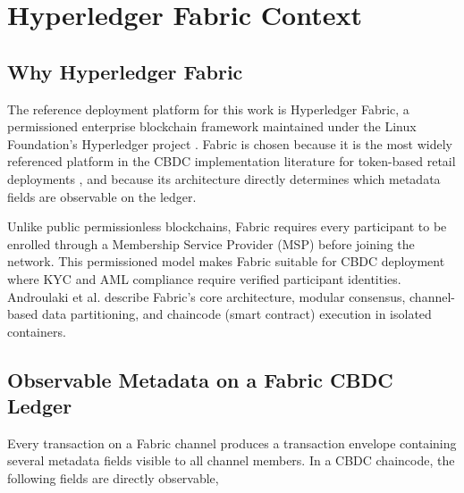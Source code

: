 \section{Hyperledger Fabric Context}
\label{sec:fabric_context}

\subsection{Why Hyperledger Fabric}

The reference deployment platform for this work is
Hyperledger Fabric, a permissioned enterprise blockchain
framework maintained under the Linux Foundation's Hyperledger
project \cite{hyperledgerfabric2023}. Fabric is chosen
because it is the most widely referenced platform in the
CBDC implementation literature for token-based retail
deployments \cite{biscgide2024}, and because its
architecture directly determines which metadata fields are
observable on the ledger.

Unlike public permissionless blockchains, Fabric requires
every participant to be enrolled through a Membership Service
Provider (MSP) before joining the network. This permissioned
model makes Fabric suitable for CBDC deployment where KYC
and AML compliance require verified participant identities.
Androulaki et al. \cite{androulaki2018} describe Fabric's
core architecture, modular consensus, channel-based data
partitioning, and chaincode (smart contract) execution in
isolated containers.

\subsection{Observable Metadata on a Fabric CBDC Ledger}

Every transaction on a Fabric channel produces a transaction
envelope containing several metadata fields visible to all
channel members. In a CBDC chaincode, the following fields
are directly observable,

